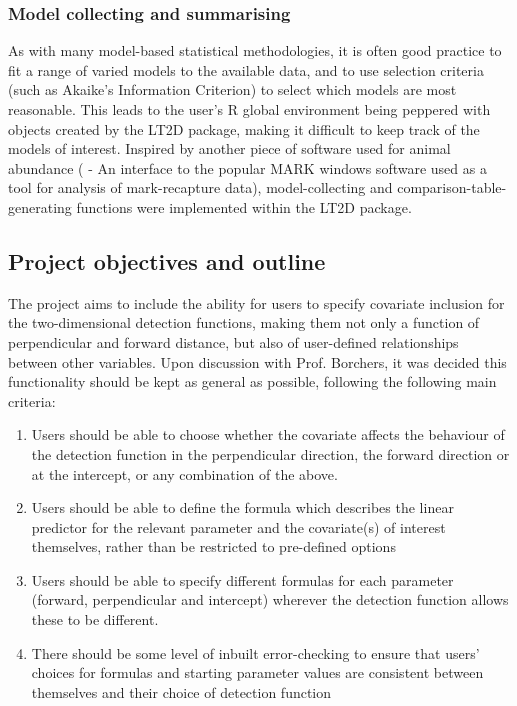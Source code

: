 \documentclass[11pt]{article}
\begin{document}
\begin{multicols}{2}
\subsubsection{Model collecting and summarising}
As with many model-based statistical methodologies, it is often good practice to fit a range of varied models to the available data, and to use selection criteria (such as Akaike's Information Criterion) to select which models are most reasonable. This leads to the user's R global environment being peppered with objects created by the LT2D package, making it difficult to keep track of the models of interest. Inspired by another piece of software used for animal abundance (\cite{rmark} - An interface to the popular MARK windows software used as a tool for analysis of mark-recapture data), model-collecting and comparison-table-generating functions were implemented within the LT2D package.

\subsection{Project objectives and outline}
The project aims to include the ability for users to specify covariate inclusion for the two-dimensional detection functions, making them not only a function of perpendicular and forward distance, but also of user-defined relationships between other variables. Upon discussion with Prof. Borchers, it was decided this functionality should be kept as general as possible, following the following main criteria:

\begin{enumerate}
\item Users should be able to choose whether the covariate affects the behaviour of the detection function in the perpendicular direction, the forward direction or at the intercept, or any combination of the above.
\item Users should be able to define the formula which describes the linear predictor for the relevant parameter and the covariate(s) of interest themselves, rather than be restricted to pre-defined options
\item Users should be able to specify different formulas for each parameter (forward, perpendicular and intercept) wherever the detection function allows these to be different.
\item There should be some level of inbuilt error-checking to ensure that users' choices for formulas and starting parameter values are consistent between themselves and their choice of detection function
\end{enumerate}


\end{multicols}
\end{document}
